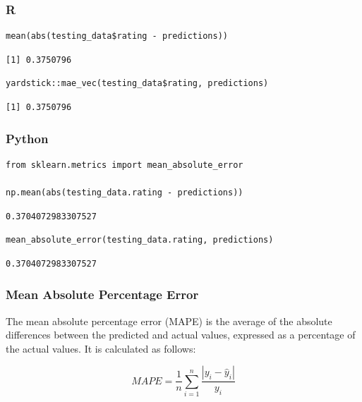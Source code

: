 \documentclass[
  letterpaper,
]{krantz}
\begin{document}
\subsubsection{R}

\begin{verbatim}
mean(abs(testing_data$rating - predictions))
\end{verbatim}

\begin{verbatim}
[1] 0.3750796
\end{verbatim}

\begin{verbatim}
yardstick::mae_vec(testing_data$rating, predictions)
\end{verbatim}

\begin{verbatim}
[1] 0.3750796
\end{verbatim}

\subsubsection{Python}

\begin{verbatim}
from sklearn.metrics import mean_absolute_error

np.mean(abs(testing_data.rating - predictions))
\end{verbatim}

\begin{verbatim}
0.3704072983307527
\end{verbatim}

\begin{verbatim}
mean_absolute_error(testing_data.rating, predictions)
\end{verbatim}

\begin{verbatim}
0.3704072983307527
\end{verbatim}

\subsubsection{Mean Absolute Percentage
Error}\label{sec-knowing-metrics-mape}

The mean absolute percentage error (MAPE) is the average of the absolute
differences between the predicted and actual values, expressed as a
percentage of the actual values. It is calculated as follows:

\[MAPE = \frac{1}{n}\sum_{i=1}^{n}\frac{|y_i - \hat{y}_i|}{y_i}\]
\end{document}
